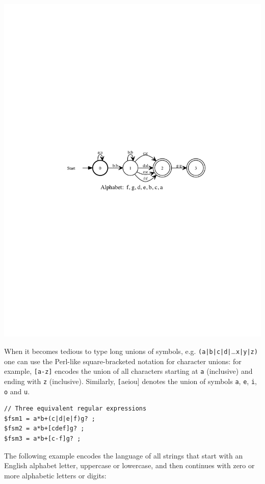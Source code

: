 \begin{center}
\includegraphics{images/infin.pdf}
\end{center}

When it becomes tedious to type long unions of symbols, e.g.
\texttt{(a|b|c|d|}\ldots{}\texttt{x|y|z)} one can
use the Perl-like square-bracketed notation for character unions: for
example, \texttt{[a-z]} encodes the union of all characters starting at
\texttt{a} (inclusive) and ending with \texttt{z} (inclusive).  Similarly, \texttt[aeiou] denotes
the union of symbols \texttt{a}, \texttt{e}, \texttt{i}, \texttt{o} and \texttt{u}.


\begin{Verbatim}
// Three equivalent regular expressions
$fsm1 = a*b+(c|d|e|f)g? ;
$fsm2 = a*b+[cdef]g? ;
$fsm3 = a*b+[c-f]g? ;
\end{Verbatim}

\noindent
The following example encodes the language of all strings that start with an English
alphabet letter, uppercase or lowercase, and then continues with zero or more alphabetic letters or digits:

